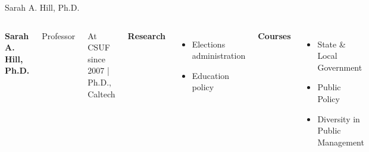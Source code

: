 \documentclass[10pt]{beamer}
\newlength{\imageheight}
\begin{document}
\begin{frame}{Sarah A. Hill, Ph.D.}
\begin{columns}[T,onlytextwidth]
    \raggedright
    {\large\bfseries Sarah A. Hill, Ph.D.}\par
    {Professor}\par
    {\footnotesize At CSUF since 2007 \quad | \quad Ph.D., Caltech}\par\vspace{0.4em}

    \textbf{Research}
    \begin{itemize}
      \item Elections administration
      \item Education policy
    \end{itemize}

    \textbf{Courses}
    \begin{itemize}
      \item State \& Local Government
      \item Public Policy
      \item Diversity in Public Management
    \end{itemize}

    \vspace*{0.25cm}
    \includegraphics[height=\imageheight]{images/hill.jpg}
\end{columns}
\end{frame}
\end{document}
